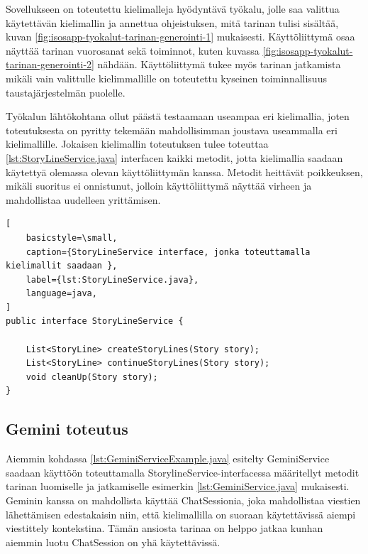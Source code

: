 Sovellukseen on toteutettu kielimalleja hyödyntävä työkalu, jolle saa valittua
käytettävän kielimallin ja annettua ohjeistuksen, mitä tarinan tulisi sisältää,
kuvan \ref{fig:isosapp-tyokalut-tarinan-generointi-1} mukaisesti.
Käyttöliittymä osaa näyttää tarinan vuorosanat sekä toiminnot, kuten kuvassa
\ref{fig:isosapp-tyokalut-tarinan-generointi-2} nähdään. Käyttöliittymä tukee
myös tarinan jatkamista mikäli vain valittulle kielimmallille on toteutettu
kyseinen toiminnallisuus taustajärjestelmän puolelle.

Työkalun lähtökohtana ollut päästä testaamaan useampaa eri kielimallia, joten
toteutuksesta on pyritty tekemään mahdollisimman joustava useammalla eri
kielimallille. Jokaisen kielimallin toteutuksen tulee toteuttaa
\ref{lst:StoryLineService.java} interfacen kaikki metodit, jotta kielimallia
saadaan käytettyä olemassa olevan käyttöliittymän kanssa. Metodit heittävät
poikkeuksen, mikäli suoritus ei onnistunut, jolloin käyttöliittymä näyttää
virheen ja mahdollistaa uudelleen yrittämisen.

\clearpage
\begin{lstlisting}[
    basicstyle=\small,
    caption={StoryLineService interface, jonka toteuttamalla kielimallit saadaan },
    label={lst:StoryLineService.java},
    language=java,
]
public interface StoryLineService {

    List<StoryLine> createStoryLines(Story story);
    List<StoryLine> continueStoryLines(Story story);
    void cleanUp(Story story);
}
\end{lstlisting}

\subsection{Gemini toteutus}

Aiemmin kohdassa \ref{lst:GeminiServiceExample.java} esitelty GeminiService
saadaan käyttöön toteuttamalla StorylineService-interfacessa määritellyt
metodit tarinan luomiselle ja jatkamiselle esimerkin
\ref{lst:GeminiService.java} mukaisesti. Geminin kanssa on mahdollista käyttää
ChatSessionia, joka mahdollistaa viestien lähettämisen edestakaisin niin, että
kielimallilla on suoraan käytettävissä aiempi viestittely kontekstina. Tämän
ansiosta tarinaa on helppo jatkaa kunhan aiemmin luotu ChatSession on yhä
käytettävissä.

